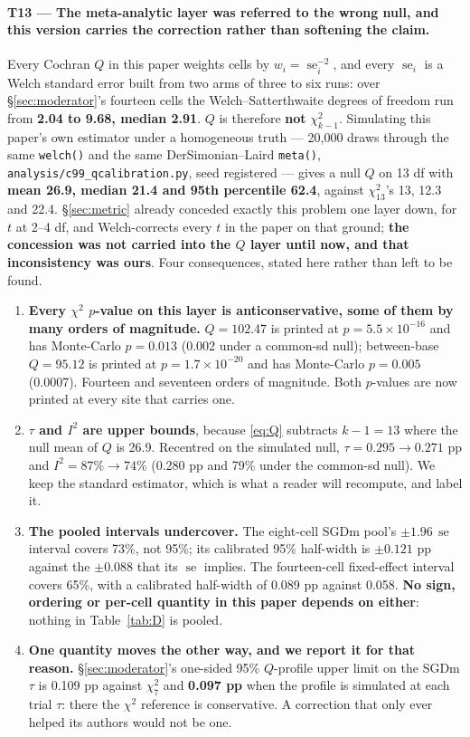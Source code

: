 \documentclass[10pt,letterpaper]{article}
\DeclareMathOperator{\se}{se}
\begin{document}
\paragraph{T13 --- The meta-analytic layer was referred to the wrong null, and this version
carries the correction rather than softening the claim.}
Every Cochran $Q$ in this paper weights cells by $w_i = \se_i^{-2}$, and every $\se_i$ is a
Welch standard error built from two arms of three to six runs: over \S\ref{sec:moderator}'s
fourteen cells the Welch--Satterthwaite degrees of freedom run from \textbf{2.04 to 9.68, median
2.91}. $Q$ is therefore \textbf{not} $\chi^2_{k-1}$. Simulating this paper's own estimator under
a homogeneous truth --- 20{,}000 draws through the same \texttt{welch()} and the same
DerSimonian--Laird \texttt{meta()}, \texttt{analysis/c99\_qcalibration.py}, seed registered ---
gives a null $Q$ on 13 df with \textbf{mean 26.9, median 21.4 and 95th percentile 62.4}, against
$\chi^2_{13}$'s 13, 12.3 and 22.4. \S\ref{sec:metric} already conceded exactly this problem one
layer down, for $t$ at 2--4 df, and Welch-corrects every $t$ in the paper on that ground;
\textbf{the concession was not carried into the $Q$ layer until now, and that inconsistency was
ours}. Four consequences, stated here rather than left to be found.
\begin{enumerate}
\item \textbf{Every $\chi^2$ $p$-value on this layer is anticonservative, some of them by many
  orders of magnitude.} $Q = 102.47$ is printed at $p = 5.5\times10^{-16}$ and has Monte-Carlo
  $p = 0.013$ (0.002 under a common-sd null); between-base $Q = 95.12$ is printed at
  $p = 1.7\times10^{-20}$ and has Monte-Carlo $p = 0.005$ (0.0007). Fourteen and seventeen orders
  of magnitude. Both $p$-values are now printed at every site that carries one.
\item \textbf{$\tau$ and $I^2$ are upper bounds}, because \eqref{eq:Q} subtracts $k - 1 = 13$
  where the null mean of $Q$ is 26.9. Recentred on the simulated null, $\tau = 0.295 \to 0.271$
  pp and $I^2 = 87\% \to 74\%$ (0.280 pp and 79\% under the common-sd null). We keep the
  standard estimator, which is what a reader will recompute, and label it.
\item \textbf{The pooled intervals undercover.} The eight-cell SGDm pool's $\pm 1.96\,\se$
  interval covers 73\%, not 95\%; its calibrated 95\% half-width is $\pm 0.121$ pp against the
  $\pm 0.088$ that its $\se$ implies. The fourteen-cell fixed-effect interval covers 65\%, with
  a calibrated half-width of 0.089 pp against 0.058. \textbf{No sign, ordering or per-cell
  quantity in this paper depends on either}: nothing in Table~\ref{tab:D} is pooled.
\item \textbf{One quantity moves the other way, and we report it for that reason.}
  \S\ref{sec:moderator}'s one-sided 95\% $Q$-profile upper limit on the SGDm $\tau$ is 0.109 pp
  against $\chi^2_7$ and \textbf{0.097 pp} when the profile is simulated at each trial $\tau$:
  there the $\chi^2$ reference is conservative. A correction that only ever helped its authors
  would not be one.
\end{enumerate}
\end{document}
